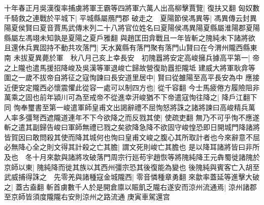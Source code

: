 十年春正月吳漢復率捕虜將軍王霸等四將軍六萬人出高柳擊賈覽|{
	復扶又翻}
匈奴數千騎救之連戰於平城下|{
	平城縣屬鴈門郡}
破走之　夏陽節侯馮異等|{
	馮異傳云封異陽夏侯賢曰夏音賈馬武傳末列二十八將官位姓名曰夏陽侯馮異陽夏縣屬淮陽郡夏陽縣屬左馮翊未知孰是夏陽之夏戶雅翻}
與趙匡田弇戰且一年皆斬之隗純未下諸將欲且還休兵異固持不動共攻落門|{
	天水冀縣有落門聚有落門山賢曰在今渭州隴西縣東南}
未拔夏異薨於軍　秋八月己亥上幸長安　初隗囂將安定高峻擁兵據高平第一|{
	帝之上隴也遣馬援招降峻及吳漢等軍退峻亡歸故營復助囂拒隴坻}
建威大將軍耿弇等圍之一歲不拔帝自將征之寇恂諫曰長安道里居中|{
	賢曰從雒陽至高平長安為中}
應接近便安定隴西必懷震懼此從容一處可以制四方也|{
	從千容翻}
今士馬疲倦方履險阻非萬乘之固也前年潁川可為至戒帝不從進幸汧峻猶不下帝遣寇恂往降之|{
	降戶江翻下同}
恂奉璽書至第一峻遣軍師皇甫文出謁辭禮不屈恂怒將誅之諸將諫曰高峻精兵萬人率多彊弩西遮隴道連年不下今欲降之而反戮其使|{
	使疏吏翻}
無乃不可乎恂不應遂斬之遣其副歸告峻曰軍師無禮已戮之矣欲降急降不欲固守峻惶恐即日開城門降諸將皆賀因曰敢問殺其使而降其城何也恂曰皇甫文峻之腹心其所取計者也今來辭意不屈必無降心全之則文得其計殺之亡其膽|{
	謂文死則峻亡其膽也}
是以降耳諸將皆曰非所及也　冬十月來歙與諸將攻破落門周宗行廵苟宇趙恢等將隗純降王元犇蜀徙諸隗於京師以東|{
	隗純降而徙其族以其西州彊宗恐其後復能為變也}
後隗純與賓客亡入胡至武威捕得誅之　先零羌與諸種寇金城隴西|{
	零音憐種章勇翻}
來歙率蓋延等進擊大破之|{
	蓋古盍翻}
斬首虜數千人於是開倉廪以賑飢乏隴右遂安而涼州流通焉|{
	涼州諸郡至京師皆須度隴隴右安則涼州之路流通}
庚寅車駕還宫

